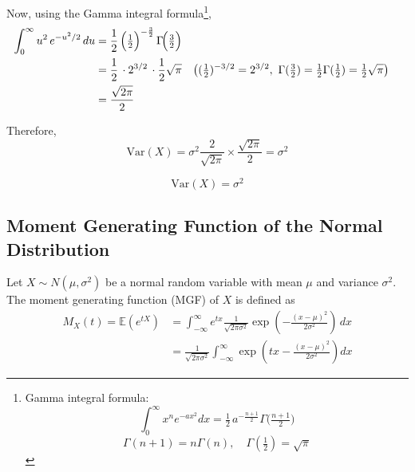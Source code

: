 \documentclass[twoside]{book}
\begin{document}
\begin{itemize}
    Now, using the Gamma integral formula\footnote{Gamma integral formula:
    $$\int_{0}^{\infty} x^n e^{-a x^2}dx
         = \tfrac12\,a^{-\frac{n+1}{2}}\Gamma\!\bigl(\tfrac{n+1}{2}\bigr)$$
         $$\Gamma(n+1) = n\Gamma(n), \quad \Gamma(\tfrac12) = \sqrt{\pi}$$
         },
    \begin{align*}
    \int_{0}^{\infty} u^2\,e^{-u^2/2}\,du
    &= \frac{1}{2}\,\Bigl(\tfrac12\Bigr)^{-\frac{3}{2}}
       \,\Gamma\!\Bigl(\tfrac{3}{2}\Bigr)\\
    &= \frac{1}{2}\,\cdot 2^{3/2}\,\cdot \frac{1}{2}\sqrt{\pi}
    &&\bigl((\tfrac12)^{-3/2}=2^{3/2},\ \Gamma(\tfrac32)=\tfrac12\Gamma(\tfrac12) = \tfrac12\sqrt\pi\bigr)\\
    &= \frac{\sqrt{2\pi}}{2}
    \end{align*}

    Therefore,
    \[
    \text{Var}(X) = \sigma^2 \frac{2}{\sqrt{2\pi}} \times \frac{\sqrt{2\pi}}{2}
      = \sigma^2
    \]

        \begin{textbox}
        \[
        \text{Var}(X) = \sigma^2
        \]
        \end{textbox}
\end{itemize}

\subsection{Moment Generating Function of the Normal Distribution}

Let \( X \sim N(\mu, \sigma^2) \) be a normal random variable with mean \(\mu\) and variance \(\sigma^2\). The moment generating function (MGF) of \(X\) is defined as
\begin{align*}
M_X(t) = \mathbb{E}\left( e^{tX}\right)  &= \int_{-\infty}^{\infty} e^{tx} \frac{1}{\sqrt{2\pi\sigma^2}} \exp\left(-\frac{(x-\mu)^2}{2\sigma^2}\right) \, dx \\
&=\frac{1}{\sqrt{2\pi\sigma^2}} \int_{-\infty}^{\infty} \exp\left(tx - \frac{(x-\mu)^2}{2\sigma^2}\right) dx
\end{align*}
\end{document}
